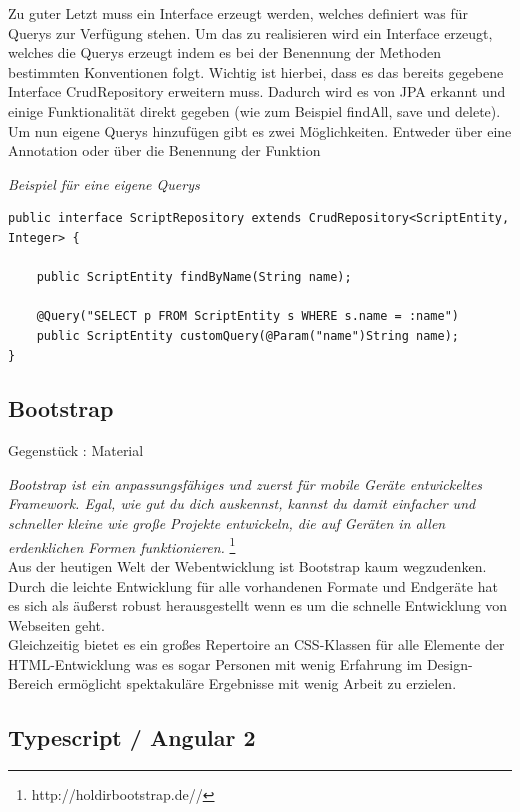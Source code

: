 Zu guter Letzt muss ein Interface erzeugt werden, welches definiert was für Querys zur Verfügung stehen. Um das zu realisieren wird ein Interface erzeugt, welches die Querys erzeugt indem es bei der Benennung der Methoden bestimmten Konventionen folgt. Wichtig ist hierbei, dass es das bereits gegebene Interface CrudRepository erweitern muss. Dadurch wird es von JPA erkannt und einige Funktionalität direkt gegeben (wie zum Beispiel findAll, save und delete).
Um nun eigene Querys hinzufügen gibt es zwei Möglichkeiten. Entweder über eine Annotation oder über die Benennung der Funktion

\begin{minipage}{\textwidth}
\emph{Beispiel für eine eigene Querys}
\begin{lstlisting}
public interface ScriptRepository extends CrudRepository<ScriptEntity, Integer> {

	public ScriptEntity findByName(String name);
	
	@Query("SELECT p FROM ScriptEntity s WHERE s.name = :name")
	public ScriptEntity customQuery(@Param("name")String name);
}
\end{lstlisting}
\end{minipage}

\subsection{Bootstrap}

Gegenstück : Material

\emph{\glqq   
Bootstrap ist ein anpassungsfähiges und zuerst für mobile Geräte entwickeltes Framework. Egal, wie gut du dich auskennst, kannst du damit einfacher und schneller kleine wie große Projekte entwickeln, die auf Geräten in allen erdenklichen Formen funktionieren.
\grqq} \footnote{http://holdirbootstrap.de//} \\

Aus der heutigen Welt der Webentwicklung ist Bootstrap kaum wegzudenken. Durch die leichte Entwicklung für alle vorhandenen Formate und Endgeräte hat es sich als äußerst robust herausgestellt wenn es um die schnelle Entwicklung von Webseiten geht. \\
Gleichzeitig bietet es ein großes Repertoire an CSS-Klassen für alle Elemente der HTML-Entwicklung was es sogar Personen mit wenig Erfahrung im Design-Bereich ermöglicht spektakuläre Ergebnisse mit wenig Arbeit zu erzielen.



\subsection{Typescript / Angular 2}


